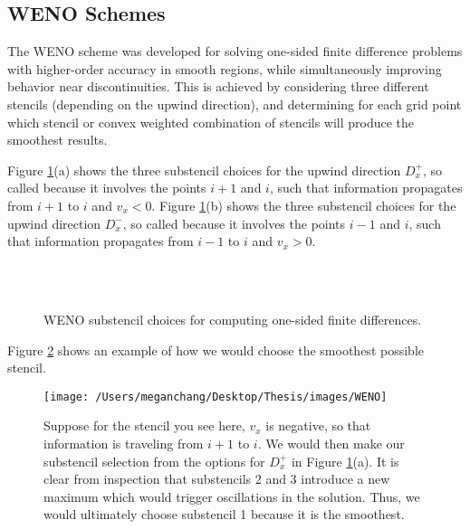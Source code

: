 \documentclass[oneside,12pt,final]{/Applications/TeX/packages/ucthesis-CA2012}
\begin{document}
\begin{mainmatter}
\section{WENO Schemes}  \label{section:WENO}
The WENO scheme was developed for solving one-sided finite difference problems with higher-order accuracy in smooth regions, while simultaneously improving behavior near discontinuities. This is achieved by considering three different stencils (depending on the upwind direction), and determining for each grid point which stencil or convex weighted combination of stencils will produce the smoothest results.

Figure \ref{fig:WENO_choice}(a) shows the three substencil choices for the upwind direction $D_{x}^{+}$, so called because it involves the points $i+1$ and $i$, such that information propagates from $i+1$ to $i$ and $v_x < 0$. Figure \ref{fig:WENO_choice}(b) shows the three substencil choices for the upwind direction $D_{x}^{-}$, so called because it involves the points $i-1$ and $i$, such that information propagates from $i-1$ to $i$ and $v_x > 0$. 

\begin{figure} [!h]
\centering
{} \\
\\
    \caption[WENO Substencil Choices for Computing One-Sided Finite Differences]{WENO substencil choices for computing one-sided finite differences.}
  \label{fig:WENO_choice}
\end{figure}
Figure \ref{fig:WENO_example} shows an example of how we would choose the smoothest possible stencil.

\begin{figure} [!h]
\centering
\texttt{[image: /Users/meganchang/Desktop/Thesis/images/WENO]}
    \caption[WENO Substencil Selection Example]{Suppose for the stencil you see here, $v_x$ is negative, so that information is traveling from $i+1$ to $i$. We would then make our substencil selection from the options for $D_{x}^{+}$ in Figure \ref{fig:WENO_choice}(a). It is clear from inspection that substencils 2 and 3 introduce a new maximum which would trigger oscillations in the solution. Thus, we would ultimately choose substencil 1 because it is the smoothest.}
  \label{fig:WENO_example}
\end{figure}


\end{mainmatter}
\end{document}
